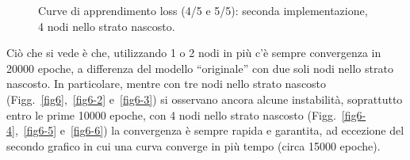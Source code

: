 \documentclass[a4paper,12pt]{article}
\begin{document}
\begin{figure}[htp]
    \centering

    \medskip


    \caption{Curve di apprendimento loss (4/5 e 5/5): seconda implementazione, 4 nodi nello strato nascosto.}
    \label{fig6-6}
\end{figure}



\newpage
Ciò che si vede è che, utilizzando 1 o 2 nodi in più c'è sempre convergenza in 20000 epoche, a differenza del modello ``originale'' con due soli nodi nello strato nascosto. In particolare, mentre con tre nodi nello strato nascosto (Figg.~\vref{fig6},~\vref{fig6-2} e~\vref{fig6-3}) si osservano ancora alcune instabilità, soprattutto entro le prime 10000 epoche, con 4 nodi nello strato nascosto (Figg.~\vref{fig6-4},~\vref{fig6-5} e~\vref{fig6-6}) la convergenza è sempre rapida e garantita, ad eccezione del secondo grafico in cui una curva converge in più tempo (circa 15000 epoche).
\end{document}
